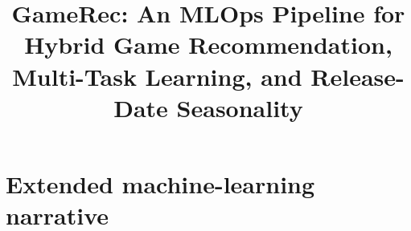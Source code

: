 \documentclass[conference]{IEEEtran}
\begin{document}
\title{GameRec: An MLOps Pipeline for Hybrid Game Recommendation,\\
Multi-Task Learning, and Release-Date Seasonality}

\author{
}

\maketitle













\clearpage
\appendices
\section{Extended machine-learning narrative}\label{app:extended}

\end{document}
